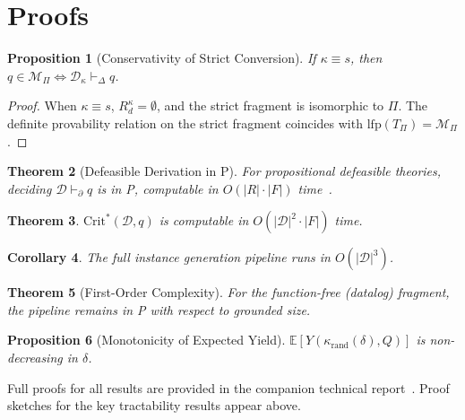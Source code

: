 \documentclass{article}
\newtheorem{theorem}{Theorem}[section]
\newtheorem{proposition}[theorem]{Proposition}
\newtheorem{corollary}[theorem]{Corollary}
\theoremstyle{definition}
\newcommand{\D}{\mathcal{D}}
\newcommand{\Rd}{R_d}
\newcommand{\partfunc}{\kappa}
\newcommand{\CritStar}{\mathrm{Crit}^{*}}
\newcommand{\pDelta}{\vdash_{\Delta}}
\newcommand{\pPartial}{\vdash_{\partial}}
\begin{document}
\section{Proofs}\label{app:proofs}

\begin{proposition}[Conservativity of Strict Conversion]\label{prop:strict}
If $\partfunc \equiv s$, then $q \in \mathcal{M}_\Pi \iff \D_\partfunc \pDelta q$.
\end{proposition}

\begin{proof}
When $\partfunc \equiv s$, $\Rd^{\partfunc} = \emptyset$, and the strict fragment is isomorphic to $\Pi$. The definite provability relation on the strict fragment coincides with $\mathrm{lfp}(T_\Pi) = \mathcal{M}_\Pi$.
\end{proof}

\begin{theorem}[Defeasible Derivation in P]\label{thm:derivP}
For propositional defeasible theories, deciding $\D \pPartial q$ is in P, computable in $O(|R| \cdot |F|)$ time~\cite{maher2001propositional}.
\end{theorem}

\begin{theorem}\label{thm:critP}
$\CritStar(\D, q)$ is computable in $O(|\D|^2 \cdot |F|)$ time.
\end{theorem}

\begin{corollary}\label{cor:cubic}
The full instance generation pipeline runs in $O(|\D|^3)$.
\end{corollary}

\begin{theorem}[First-Order Complexity]\label{thm:firstorder}
For the function-free (datalog) fragment, the pipeline remains in P with respect to grounded size.
\end{theorem}

\begin{proposition}[Monotonicity of Expected Yield]\label{prop:yieldmono}
$\mathbb{E}[Y(\partfunc_{\mathrm{rand}}(\delta), Q)]$ is non-decreasing in $\delta$.
\end{proposition}

Full proofs for all results are provided in the companion technical report~\cite{cooper2026defab}. Proof sketches for the key tractability results appear above.


\end{document}
